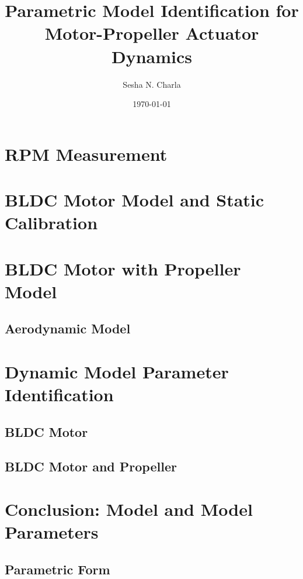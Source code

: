 \documentclass[letterpaper, 11pt]{article}
\title{Parametric Model Identification for Motor-Propeller Actuator Dynamics}
\author{Sesha N. Charla}
\date{\today}
\begin{document}
\maketitle
\tableofcontents

\newpage
\section{RPM Measurement}

\newpage
\section{BLDC Motor Model and Static Calibration}




\newpage
\section{BLDC Motor with Propeller Model}
\subsection{Aerodynamic Model}


\newpage
\section{Dynamic Model Parameter Identification}
\subsection{BLDC Motor}
\subsection{BLDC Motor and Propeller}
\newpage
\section{Conclusion: Model and Model Parameters}
\subsection{Parametric Form}


\end{document}
